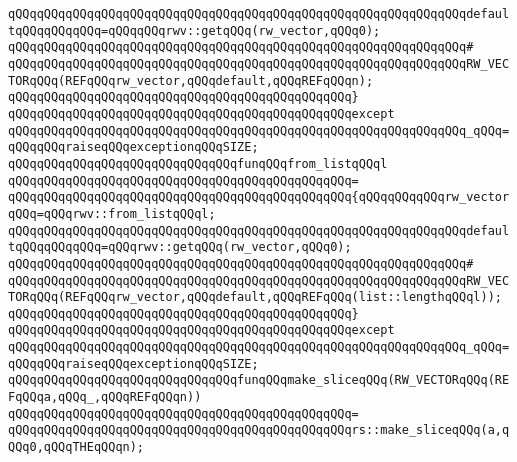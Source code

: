 \verb|qQQqqQQqqQQqqQQqqQQqqQQqqQQqqQQqqQQqqQQqqQQqqQQqqQQqqQQqqQQqqQQqdefaultqQQqqQQqqQQq=qQQqqQQqrwv::getqQQq(rw_vector,qQQq0);|\newline
\verb|qQQqqQQqqQQqqQQqqQQqqQQqqQQqqQQqqQQqqQQqqQQqqQQqqQQqqQQqqQQqqQQq#|\newline
\verb|qQQqqQQqqQQqqQQqqQQqqQQqqQQqqQQqqQQqqQQqqQQqqQQqqQQqqQQqqQQqqQQqRW_VECTORqQQq(REFqQQqrw_vector,qQQqdefault,qQQqREFqQQqn);|\newline
\verb|qQQqqQQqqQQqqQQqqQQqqQQqqQQqqQQqqQQqqQQqqQQqqQQq}|\newline
\verb|qQQqqQQqqQQqqQQqqQQqqQQqqQQqqQQqqQQqqQQqqQQqqQQqexcept|\newline
\verb|qQQqqQQqqQQqqQQqqQQqqQQqqQQqqQQqqQQqqQQqqQQqqQQqqQQqqQQqqQQqqQQq_qQQq=qQQqqQQqraiseqQQqexceptionqQQqSIZE;|\newline
\newline
\newline
\verb|qQQqqQQqqQQqqQQqqQQqqQQqqQQqqQQqfunqQQqfrom_listqQQql|\newline
\verb|qQQqqQQqqQQqqQQqqQQqqQQqqQQqqQQqqQQqqQQqqQQqqQQq=|\newline
\verb|qQQqqQQqqQQqqQQqqQQqqQQqqQQqqQQqqQQqqQQqqQQqqQQq{qQQqqQQqqQQqrw_vectorqQQq=qQQqrwv::from_listqQQql;|\newline
\verb|qQQqqQQqqQQqqQQqqQQqqQQqqQQqqQQqqQQqqQQqqQQqqQQqqQQqqQQqqQQqqQQqdefaultqQQqqQQqqQQq=qQQqrwv::getqQQq(rw_vector,qQQq0);|\newline
\verb|qQQqqQQqqQQqqQQqqQQqqQQqqQQqqQQqqQQqqQQqqQQqqQQqqQQqqQQqqQQqqQQq#|\newline
\verb|qQQqqQQqqQQqqQQqqQQqqQQqqQQqqQQqqQQqqQQqqQQqqQQqqQQqqQQqqQQqqQQqRW_VECTORqQQq(REFqQQqrw_vector,qQQqdefault,qQQqREFqQQq(list::lengthqQQql));|\newline
\verb|qQQqqQQqqQQqqQQqqQQqqQQqqQQqqQQqqQQqqQQqqQQqqQQq}|\newline
\verb|qQQqqQQqqQQqqQQqqQQqqQQqqQQqqQQqqQQqqQQqqQQqqQQqexcept|\newline
\verb|qQQqqQQqqQQqqQQqqQQqqQQqqQQqqQQqqQQqqQQqqQQqqQQqqQQqqQQqqQQqqQQq_qQQq=qQQqqQQqraiseqQQqexceptionqQQqSIZE;|\newline
\newline
\newline
\verb|qQQqqQQqqQQqqQQqqQQqqQQqqQQqqQQqfunqQQqmake_sliceqQQq(RW_VECTORqQQq(REFqQQqa,qQQq_,qQQqREFqQQqn))|\newline
\verb|qQQqqQQqqQQqqQQqqQQqqQQqqQQqqQQqqQQqqQQqqQQqqQQq=|\newline
\verb|qQQqqQQqqQQqqQQqqQQqqQQqqQQqqQQqqQQqqQQqqQQqqQQqrs::make_sliceqQQq(a,qQQq0,qQQqTHEqQQqn);|\newline
